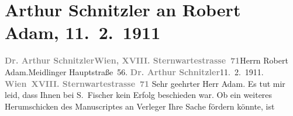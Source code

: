 

         
         \renewcommand{\erwaehntePersonen}{Personen: Robert Adam}
         \renewcommand{\erwaehnteInstitutionen}{Institutionen: Der Merker, Die Schaubühne / Die Weltbühne, S. Fischer Verlag}
         \renewcommand{\erwaehnteOrte}{Orte: Meidlinger Hauptstraße, Sternwartestraße, Wien, XII., Meidling}
         \renewcommand{\erwaehnteWerke}{Werke: Neidhard}
               \section[Arthur Schnitzler an Robert Adam, 11. 2. 1911]{ Arthur Schnitzler an Robert Adam, 11. 2. 1911}\nopagebreak{}\rehead{ }\begin{ledgroupsized}[t]{13cm}\normalsize\beginnumbering \toendnotes[C]{\smallbreak\pagebreak[2]} 
\toendnotes[C]{\smallbreak}\pstart{}{\pb}\textcolor{gray}{\textbf{Dr. Arthur Schnitzler}}\pend{}\pstart{}\textcolor{gray}{\textbf{Wien, XVIII. Sternwartestrasse 71}}\pend{}{\bigskip}\pstart{}{\pb}Herrn Robert Adam\pend{}\pstart{}.\pend{}\pstart{}Meidlinger Hauptstraße 56.\pend{}{\bigskip}\pstart
           {\pb}\textcolor{gray}{\textbf{Dr. Arthur Schnitzler}}\hfill 11. 2. 1911.\pend
           \pstart
           \textcolor{gray}{\textbf{Wien XVIII. Sternwartestrasse 71}}\pend
           \pstart\center{}Sehr geehrter Herr Adam.\pend\pstart
           Es tut mir leid, dass Ihnen bei S. Fischer kein
               Erfolg beschieden war. Ob ein weiteres Herumschicken des Manuscriptes an Verleger Ihre Sache fördern könnte, ist

\end{ledgroupsized}
